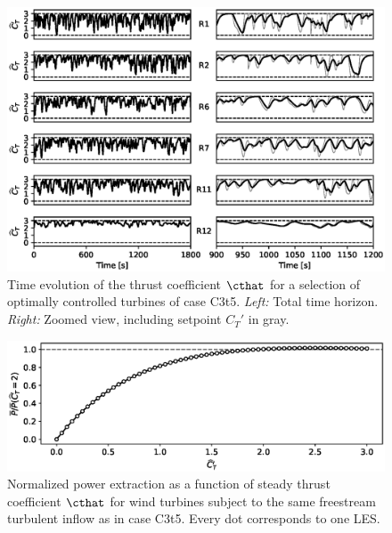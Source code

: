 	\begin{figure}
		\includegraphics[width=\textwidth]{chapters/analysis_induction_control/controls.eps}
		\caption{Time evolution of the thrust coefficient $\cthat$ for a selection of optimally controlled turbines  of case C3t5. \emph{Left: } Total time horizon. \emph{Right: } Zoomed view, including setpoint $C_T'$ in gray. \label{fig:controls}}
	\end{figure}
	
	\begin{figure}
		\includegraphics[width=\textwidth]{chapters/analysis_induction_control/sweep_ct.eps}
		\caption{Normalized power extraction as a function of steady thrust coefficient $\cthat$ for wind turbines subject to the same freestream turbulent inflow as in case C3t5. Every dot corresponds to one LES.\label{fig:ct_sweep}}
	\end{figure}
	

